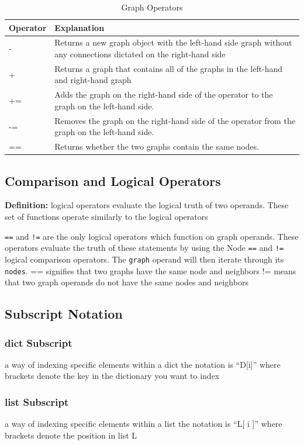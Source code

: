 \documentclass{article}
\newcommand{\code}[1]{\texttt{#1}} %
\begin{document}
\begin{table}[H]
\centering
\begin{tabular}{| p{1.5in} | p{2.75in} |}
\hline
Operator & Explanation \\
\hline
- & Returns a new graph object with the left-hand side graph without any connections dictated on the right-hand side \\
\hline
+ & Returns a graph that contains all of the graphs in the left-hand and right-hand graph \\
\hline
+= & Adds the graph on the right-hand side of the operator to the graph on the left-hand side. \\
\hline
-= & Removes the graph on the right-hand side of the operator from the graph on the left-hand side. \\
\hline
== & Returns whether the two graphs contain the same nodes. \\
\hline
\end{tabular}
\caption{Graph Operators}
\label{tbl:graph-ops}
\end{table}

\subsection{Comparison and Logical Operators}

\textbf{Definition: } logical operators evaluate the logical truth of two operands. These set of functions operate similarly to the logical operators

\code{==} and \code{!=} are the only logical operators which function on graph operands. These operators evaluate the truth of these statements by using the Node \code{==} and \code{!=} logical comparison operators. The \code{graph} operand will then iterate through its \code{nodes}.
== signifies that two graphs have the same node and neighbors 
!= means that two graph operands do not have the same nodes and neighbors
\subsection{Subscript Notation}

\subsubsection{dict Subscript}
a way of indexing specific elements within a dict the notation is “D[i]” where brackets denote the key in the dictionary you want to index
\subsubsection{list Subscript}
a way of indexing specific elements within a list the notation is “L[ i ]” where brackets denote the position in list L 
\end{document}
